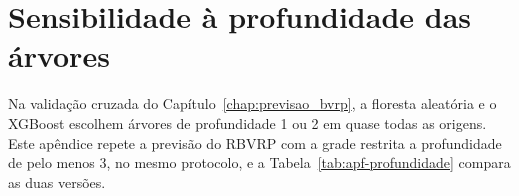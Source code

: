 \chapter{Sensibilidade à profundidade das árvores}
\label{app:profundidade}

Na validação cruzada do Capítulo~\ref{chap:previsao_bvrp}, a floresta
aleatória e o XGBoost escolhem árvores de profundidade 1 ou 2 em quase todas as
origens. Este apêndice repete a previsão do RBVRP com a grade restrita a
profundidade de pelo menos 3, no mesmo protocolo, e a
Tabela~\ref{tab:apf-profundidade} compara as duas versões.


